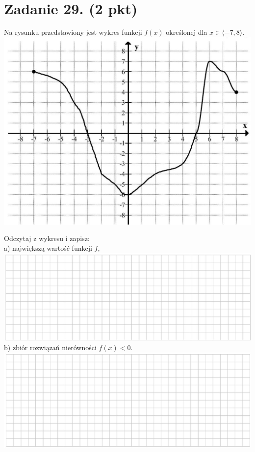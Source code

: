 \documentclass[10pt]{article}
\begin{document}
\section*{Zadanie 29. (2 pkt)}
Na rysunku przedstawiony jest wykres funkcji \(f(x)\) określonej dla \(x \in\langle-7,8\rangle\).\\
\includegraphics[max width=\textwidth, center]{2024_11_21_e0e8aab895018a50a9a7g-13(2)}

Odczytaj z wykresu i zapisz:\\
a) największą wartość funkcji \(f\),\\
\includegraphics[max width=\textwidth, center]{2024_11_21_e0e8aab895018a50a9a7g-13(1)}\\
b) zbiór rozwiązań nierówności \(f(x)<0\).\\
\includegraphics[max width=\textwidth, center]{2024_11_21_e0e8aab895018a50a9a7g-13}
\end{document}
